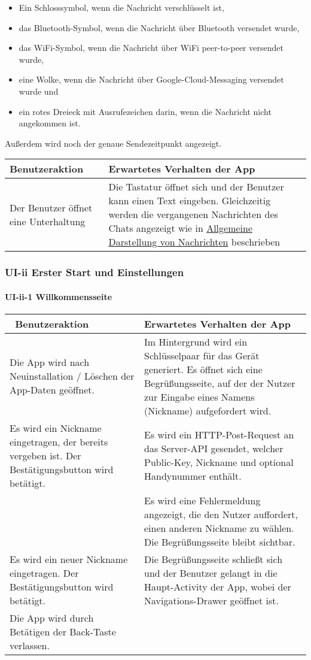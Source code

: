 \begin{itemize}
\tightlist
\item Ein Schlosssymbol, wenn die Nachricht verschlüsselt ist,
\item das Bluetooth-Symbol, wenn die Nachricht über Bluetooth versendet wurde,
\item das WiFi-Symbol, wenn die Nachricht über WiFi peer-to-peer versendet wurde,
\item eine Wolke, wenn die Nachricht über Google-Cloud-Messaging versendet wurde und
\item ein rotes Dreieck mit Ausrufezeichen darin, wenn die Nachricht nicht angekommen ist.
\end{itemize}

Außerdem wird noch der genaue Sendezeitpunkt angezeigt.

\begin{longtable}{|p{8cm}|p{8.5cm}|}
\hline
Benutzeraktion & Erwartetes Verhalten der App\tabularnewline
\hline

Der Benutzer öffnet eine Unterhaltung & Die Tastatur öffnet sich und der
Benutzer kann einen Text eingeben. Gleichzeitig werden die vergangenen
Nachrichten des Chats angezeigt wie in
\href{Manueller-Test-UI\#allgemeine-darstellung-der-nachrichten}{Allgemeine
Darstellung von Nachrichten} beschrieben\tabularnewline
\hline
\end{longtable}



\clearpage
\subsubsection{UI-ii Erster Start und Einstellungen}

\paragraph{UI-ii-1 Willkommensseite}

\begin{longtable}{|p{8cm}|p{8.5cm}|}
\hline
~Benutzeraktion & Erwartetes Verhalten der App\tabularnewline
\hline

Die App wird nach Neuinstallation / Löschen der App-Daten geöffnet. & Im
Hintergrund wird ein Schlüsselpaar für das Gerät generiert. Es öffnet
sich eine Begrüßungsseite, auf der der Nutzer zur Eingabe eines Namens
(Nickname) aufgefordert wird.\tabularnewline
Es wird ein Nickname eingetragen, der bereits vergeben ist. Der
Bestätigungsbutton wird betätigt. & Es wird ein HTTP-Post-Request an das
Server-API gesendet, welcher Public-Key, Nickname und optional
Handynummer enthält.\tabularnewline
~ & Es wird eine Fehlermeldung angezeigt, die den Nutzer auffordert,
einen anderen Nickname zu wählen. Die Begrüßungsseite bleibt
sichtbar.\tabularnewline
Es wird ein neuer Nickname eingetragen. Der Bestätigungsbutton wird
betätigt. & Die Begrüßungsseite schließt sich und der Benutzer gelangt
in die Haupt-Activity der App, wobei der Navigations-Drawer geöffnet
ist.\tabularnewline
Die App wird durch Betätigen der Back-Taste verlassen. &\tabularnewline
\hline
\end{longtable}


